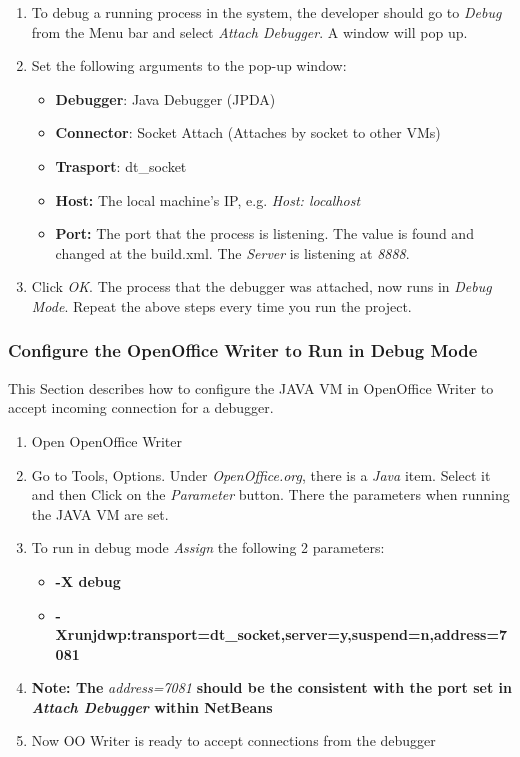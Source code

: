 \begin{enumerate}
  \item To debug a running process in the system, the developer should go to \emph{Debug} from the Menu bar and select \emph{Attach Debugger}. A window will pop up.
  \item Set the following arguments to the pop-up window: 
  \begin{itemize}
    \item \textbf{Debugger}: Java Debugger (JPDA)
    \item \textbf{Connector}: Socket Attach (Attaches by socket to other VMs)
    \item \textbf{Trasport}: dt\_socket 
    \item \textbf{Host:} The local machine's IP, e.g. \emph{Host: localhost}
    \item \textbf{Port:} The port that the process is listening. The value is found and changed at the build.xml. The \emph{Server} is listening at \emph{8888}.
  \end{itemize}
  \item Click \emph{OK}. The process that the debugger was attached, now runs in \emph{Debug Mode}.
	Repeat the above steps every time you run the project.
\end{enumerate}
  

\subsubsection{Configure the OpenOffice Writer to Run in Debug Mode}
This Section describes how to configure the JAVA VM in OpenOffice Writer to accept incoming connection for a debugger.

\begin{enumerate}
  \item Open OpenOffice Writer
  \item Go to Tools, Options. Under \emph{OpenOffice.org}, there is a \emph{Java} item. Select it and then Click on the 
        \emph{Parameter} button. There the parameters when running the JAVA VM are set.
  \item To run in debug mode \emph{Assign} the following 2 parameters:
  \begin{itemize}
    \item \textbf{-X debug}
    \item \textbf{-Xrunjdwp:transport=dt\_socket,server=y,suspend=n,address=7081}
  \end{itemize}
  \item \textbf{Note: The} \emph{address=7081} \textbf{should be the consistent with the port set in \emph{Attach Debugger} within NetBeans}
  \item  Now OO Writer is ready to accept connections from the debugger

\end{enumerate} 




